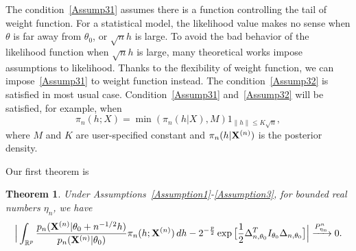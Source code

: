\documentclass[3p]{elsarticle}
\theoremstyle{plain}
\newtheorem{theorem}{\quad\quad Theorem}
\theoremstyle{definition}
\theoremstyle{remark}
\begin{document}
The condition~\ref{Assump31} assumes there is a function controlling the tail of weight function. For a statistical model, the likelihood value makes no sense when $\theta$ is far away from $\theta_0$, or $\sqrt{n}h$ is large.
To avoid the bad behavior of the likelihood function when $\sqrt{n}h$ is large, many theoretical works impose assumptions to likelihood.
Thanks to the flexibility of weight function, we can impose~\ref{Assump31} to weight function instead.
The condition~\ref{Assump32} is satisfied in most usual case.
Condition~\ref{Assump31} and~\ref{Assump32} will be satisfied, for example, when 
\begin{equation}
    \pi_n(h;X)=\min(\pi_n(h|X),M) 1_{\|h\|\leq K\sqrt{n}},
\end{equation}
where $M$ and $K$ are user-specified constant and $\pi_n(h|\mathbf{X}^{(n)})$ is the posterior density.

Our first theorem is
\begin{theorem}\label{theoremMain}
    Under Assumptions~\ref{Assumption1}-\ref{Assumption3}, for bounded real numbers $\eta_n$, we have
    \begin{equation}
        \Big|\int_{\mathbb{R}^{p}}\frac{p_n(\mathbf{X}^{(n)}|\theta_0+n^{-1/2}h)}{p_n(\mathbf{X}^{(n)}|\theta_0)}\pi_n(h;\mathbf{X}^{(n)})\,dh-
        2^{-\frac{p}{2}}\exp\big[\frac{1}{2}\Delta_{n,\theta_0}^T I_{\theta_0}\Delta_{n,\theta_0}\big]
        \Big|\xrightarrow{P_{\eta_n}^n}0.
    \end{equation}
\end{theorem}
\end{document}
